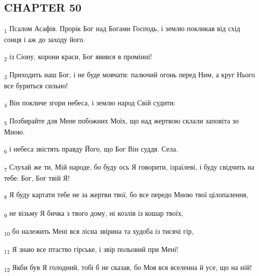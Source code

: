\subsection{CHAPTER 50}
\begin{tcolorbox}
\textsubscript{1} Псалом Асафів. Прорік Бог над Богами Господь, і землю покликав від схід сонця і аж до заходу його.
\end{tcolorbox}
\begin{tcolorbox}
\textsubscript{2} із Сіону, корони краси, Бог явився в промінні!
\end{tcolorbox}
\begin{tcolorbox}
\textsubscript{3} Приходить наш Бог, і не буде мовчати: палючий огонь перед Ним, а круг Нього все буриться сильно!
\end{tcolorbox}
\begin{tcolorbox}
\textsubscript{4} Він покличе згори небеса, і землю народ Свій судити:
\end{tcolorbox}
\begin{tcolorbox}
\textsubscript{5} Позбирайте для Мене побожних Моїх, що над жертвою склали заповіта зо Мною.
\end{tcolorbox}
\begin{tcolorbox}
\textsubscript{6} і небеса звістять правду Його, що Бог Він суддя. Села.
\end{tcolorbox}
\begin{tcolorbox}
\textsubscript{7} Слухай же ти, Мій народе, бо буду ось Я говорити, ізраїлеві, і буду свідчить на тебе: Бог, Бог твій Я!
\end{tcolorbox}
\begin{tcolorbox}
\textsubscript{8} Я буду картати тебе не за жертви твої, бо все передо Мною твої цілопалення,
\end{tcolorbox}
\begin{tcolorbox}
\textsubscript{9} не візьму Я бичка з твого дому, ні козлів із кошар твоїх,
\end{tcolorbox}
\begin{tcolorbox}
\textsubscript{10} бо належить Мені вся лісна звірина та худоба із тисячі гір,
\end{tcolorbox}
\begin{tcolorbox}
\textsubscript{11} Я знаю все птаство гірське, і звір польовий при Мені!
\end{tcolorbox}
\begin{tcolorbox}
\textsubscript{12} Якби був Я голодний, тобі б не сказав, бо Моя вся вселенна й усе, що на ній!
\end{tcolorbox}
